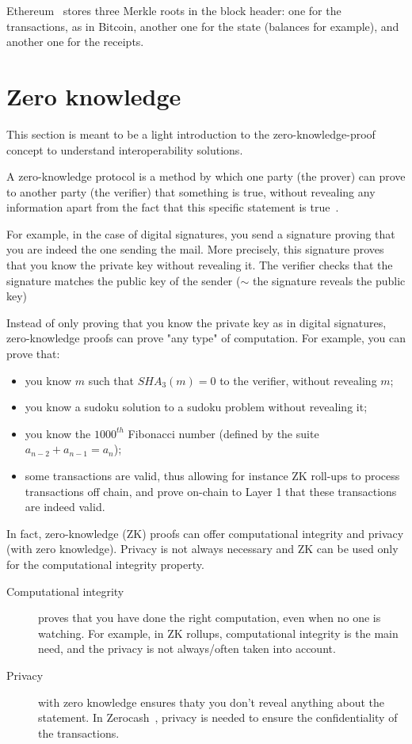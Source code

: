 Ethereum~\cite{Buterin..13} stores three Merkle roots in the block header: one for the transactions, as in Bitcoin, another one for the state (balances for example), and another one for the receipts. 

\section{Zero knowledge}
\label{zeroknowledge}
This section is meant to be a light introduction to the zero-knowledge-proof concept to understand interoperability solutions. 

A zero-knowledge protocol is a method by which one party (the prover) can prove to another party (the verifier) that something is true, without revealing any information apart from the fact that this specific statement is true~\cite{Goldwasser}.

For example, in the case of digital signatures, you send a signature proving that you are indeed the one sending the mail. More precisely, this signature proves that you know the private key without revealing it. The verifier checks that the signature matches the public key of the sender ($\sim$ the signature reveals the public key)

Instead of only proving that you know the private key as in digital signatures, zero-knowledge proofs can prove "any type" of computation. For example, you can prove that: 
\begin{itemize}
    \item you know $m$ such that $SHA_3(m)=0$ to the verifier, without revealing $m$; 
    \item you know a sudoku solution to a sudoku problem without revealing it;
    \item you know the $1000^{th}$ Fibonacci number (defined by the suite $a_{n-2}+a_{n-1}=a_n$);
    \item some transactions are valid, thus allowing for instance ZK roll-ups to process transactions off chain, and prove on-chain to Layer 1 that these transactions are indeed valid. 
\end{itemize}

In fact, zero-knowledge (ZK) proofs can offer computational integrity and privacy (with zero knowledge). Privacy is not always necessary and ZK can be used only for the computational integrity property. 
\begin{description}
    \item[Computational integrity] proves that you have done the right computation, even when no one is watching. For example, in ZK rollups,  computational integrity is the main need, and the privacy is not always/often taken into account.
    \item[Privacy] with zero knowledge ensures thaty you don't reveal anything about the statement. In Zerocash~\cite{sasson2014zerocash}, privacy is needed to ensure the confidentiality of the transactions.
\end{description}

